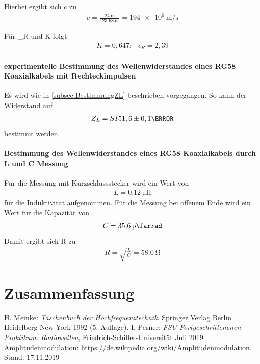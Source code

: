 \documentclass[a4paper,twoside,final]{article}
\begin{document}
Hierbei ergibt sich c zu
\begin{align}
c = \frac{\SI{24}{\meter}}{\SI{123,68}{\nano\second}}= \SI{194e6}{\meter\per\second}
\end{align}

Für \epsilon_R und K folgt
\begin{align}
K = 0,647 ;\;\;\ \epsilon_R = 2,39
\end{align}

\paragraph{experimentelle Bestimmung des Wellenwiderstandes eines RG58 Koaxialkabels mit Rechteckimpulsen}
Es wird wie in \ref{subsec:BestimmungZL} beschrieben vorgegangen. So kann der Widerstand auf
\begin{align}
Z_L = SI{51,6 \pm 0,1}{\ohm}
\end{align}
bestimmt werden.

\paragraph{Bestimmung des Wellenwiderstandes eines RG58 Koaxialkabels durch L und C Messung}
Für die Messung mit Kurzschlussstecker wird ein Wert von
\begin{align}
L = \SI{0,12}{\micro\henry}
\end{align}
für die Induktivität aufgenommen. Für die Messung bei offenem Ende wird ein Wert für die Kapazität von
\begin{align}
C = \SI{35,6}{\pico\farrad}
\end{align}
Damit ergibt sich R zu
\begin{align}
R = \sqrt{\frac{L}{C}} =  \SI{58,0}{\ohm}
\end{align}


\section{Zusammenfassung}



\begin{thebibliography}{xxx}
	H. Meinke: \textit{Taschenbuch der Hochfrequenztechnik}. Springer Verlag Berlin Heidelberg New York 1992 (5. Auflage).
  I. Perner: \textit{FSU Fortgeschrittenenen Praktikum: Radiowellen}, Fried\-rich-Schil\-ler-Uni\-versi\-tät Juli 2019
  Amplitudenmodulation: \url{https://de.wikipedia.org/wiki/Amplitudenmodulation}. Stand: 17.11.2019
\end{thebibliography}
\end{document}
